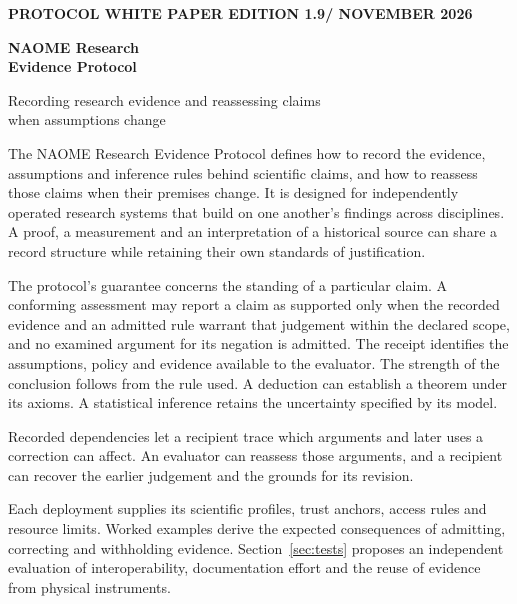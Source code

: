 \documentclass[11pt,a4paper]{article}
\newcommand{\edition}{1.9}
\newcommand{\topic}[1]{\par\smallskip{\sffamily\bfseries\color{ink}#1\par}\nobreak}
\begin{document}
\thispagestyle{empty}
{\sffamily\small\bfseries\color{accent}PROTOCOL WHITE PAPER \hfill EDITION \edition\enspace /  NOVEMBER 2026\par}
\vspace{11mm}

{\raggedright\fontsize{28}{33}\selectfont\bfseries\color{ink}NAOME Research\\
Evidence Protocol\par}
\vspace{3mm}
{\large Recording research evidence and reassessing claims\\
when assumptions change\par}
\vspace{7mm}

\topic{Abstract}
The NAOME Research Evidence Protocol defines how to record the evidence, assumptions and inference rules behind scientific claims, and how to reassess those claims when their premises change. It is designed for independently operated research systems that build on one another's findings across disciplines. A proof, a measurement and an interpretation of a historical source can share a record structure while retaining their own standards of justification.

The protocol's guarantee concerns the standing of a particular claim. A conforming assessment may report a claim as supported only when the recorded evidence and an admitted rule warrant that judgement within the declared scope, and no examined argument for its negation is admitted. The receipt identifies the assumptions, policy and evidence available to the evaluator. The strength of the conclusion follows from the rule used. A deduction can establish a theorem under its axioms. A statistical inference retains the uncertainty specified by its model.

Recorded dependencies let a recipient trace which arguments and later uses a correction can affect. An evaluator can reassess those arguments, and a recipient can recover the earlier judgement and the grounds for its revision.

\topic{Scope and evidence}
Each deployment supplies its scientific profiles, trust anchors, access rules and resource limits. Worked examples derive the expected consequences of admitting, correcting and withholding evidence. Section~\ref{sec:tests} proposes an independent evaluation of interoperability, documentation effort and the reuse of evidence from physical instruments.
\end{document}
